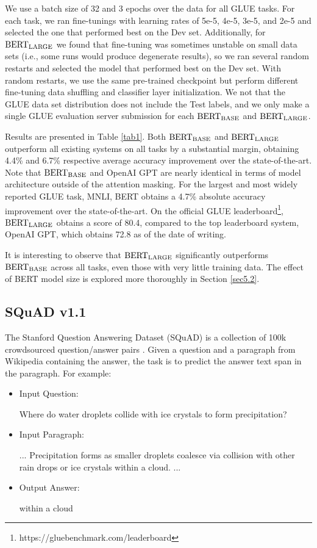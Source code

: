 		We use a batch size of 32 and 3 epochs over the data for all GLUE tasks. For each task, we ran fine-tunings with learning rates of 5e-5, 4e-5, 3e-5, and 2e-5 and selected the one that performed best on the Dev set. Additionally, for $\rm BERT_{LARGE}$ we found that fine-tuning was sometimes unstable on small data sets (i.e., some runs would produce degenerate results), so we ran several random restarts and selected the model that performed best on the Dev set. With random restarts, we use the same pre-trained checkpoint but perform different fine-tuning data shuffling and classifier layer initialization. We not that the GLUE data set distribution does not include the Test labels, and we only make a single GLUE evaluation server submission for each $\rm BERT_{BASE}$ and $\rm BERT_{LARGE}$.
		
		Results are presented in Table \ref{tab1}. Both $\rm BERT_{BASE}$ and $\rm BERT_{LARGE}$ outperform all existing systems on all tasks by a substantial margin, obtaining 4.4\% and 6.7\% respective average accuracy improvement over the state-of-the-art. Note that $\rm BERT_{BASE}$ and OpenAI GPT are nearly identical in terms of model architecture outside of the attention masking. For the largest and most widely reported GLUE task, MNLI, BERT obtains a 4.7\% absolute accuracy improvement over the state-of-the-art. On the official GLUE leaderboard\footnote{https://gluebenchmark.com/leaderboard}, $\rm BERT_{LARGE}$ obtains a score of 80.4, compared to the top leaderboard system, OpenAI GPT, which obtains 72.8 as of the date of writing.
		
		It is interesting to observe that $\rm BERT_{LARGE}$ significantly outperforms $\rm BERT_{BASE}$ across all tasks, even those with very little training data. The effect of BERT model size is explored more thoroughly in Section \ref{sec5.2}.
		
		
	\subsection{SQuAD v1.1} \label{sec4.2}
	The Stanford Question Answering Dataset (SQuAD) is a collection of 100k crowdsourced question/answer pairs \citep{Pranav2016}. Given a question and a paragraph from Wikipedia containing the answer, the task is to predict the answer text span in the paragraph. For example:
	
		\begin{itemize}
			\setlength{\itemsep}{1em} %
			\item Input Question: \par {\small {\selectfont Where do water droplets collide with ice crystals to form precipitation?}} %
			\item Input Paragraph: \par {\small{\selectfont ...  Precipitation forms as smaller droplets coalesce via collision with other rain drops or ice crystals within a cloud.  ...}} 
			\item Output Answer: \par {\small{\selectfont within a cloud}} 
		\end{itemize}
		
